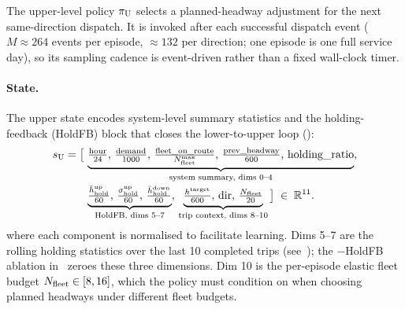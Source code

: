 The upper-level policy $\pi_{\mathrm{U}}$ selects a planned-headway adjustment for the next same-direction dispatch.
It is invoked after each successful dispatch event ($M \approx 264$ events per episode, $\approx 132$ per direction; one episode is one full service day), so its sampling cadence is event-driven rather than a fixed wall-clock timer.

\paragraph{State.}
The upper state encodes system-level summary statistics and the holding-feedback (HoldFB) block that closes the lower-to-upper loop ():
{\small
\begin{equation}
  \label{eq:upper_state}
  \begin{aligned}
    s_{\mathrm{U}} = \bigl[\,
      &\underbrace{\tfrac{\text{hour}}{24},\,
                   \tfrac{\text{demand}}{1000},\,
                   \tfrac{\text{fleet\_on\_route}}{N_{\mathrm{fleet}}^{\max}},\,
                   \tfrac{\text{prev\_headway}}{600},\,
                   \text{holding\_ratio}}_{\text{system summary, dims 0--4}},\\[-1pt]
      &\underbrace{\tfrac{\bar{h}^{\mathrm{up}}_{\mathrm{hold}}}{60},\,
                   \tfrac{\sigma^{\mathrm{up}}_{\mathrm{hold}}}{60},\,
                   \tfrac{\bar{h}^{\mathrm{down}}_{\mathrm{hold}}}{60}}_{\text{HoldFB, dims 5--7}},\,
       \underbrace{\tfrac{h^{\mathrm{target}}}{600},\,\mathrm{dir},\,\tfrac{N_{\mathrm{fleet}}}{20}}_{\text{trip context, dims 8--10}}
    \,\bigr] \;\in\; \mathbb{R}^{11}.
  \end{aligned}
\end{equation}
}
where each component is normalised to facilitate learning. Dims 5--7 are the rolling holding statistics over the last 10 completed trips (see~); the $-$HoldFB ablation in~ zeroes these three dimensions. Dim 10 is the per-episode elastic fleet budget $N_{\mathrm{fleet}} \in [8, 16]$, which the policy must condition on when choosing planned headways under different fleet budgets.

